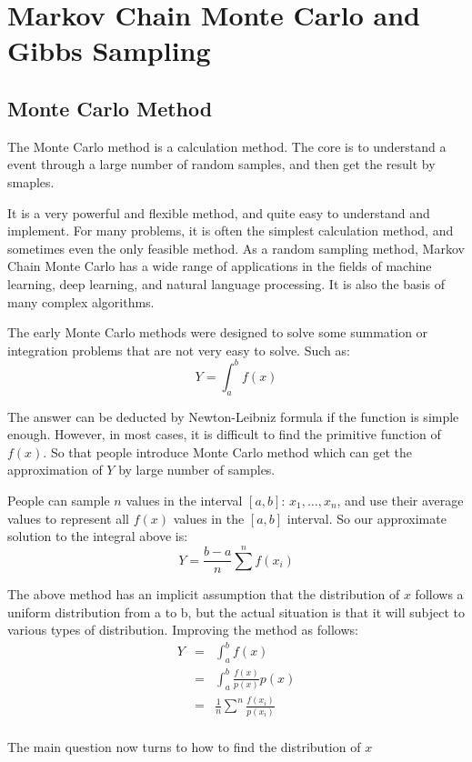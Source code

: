 \section{Markov Chain Monte Carlo and Gibbs Sampling}\label{bases}

\subsection{Monte Carlo Method}
The Monte Carlo method is a calculation method. The core is to understand a event through a large number of random samples, and then get the result by smaples.

It is a very powerful and flexible method, and quite easy to understand and implement. For many problems, it is often the simplest calculation method, and sometimes even the only feasible method.
As a random sampling method, Markov Chain Monte Carlo has a wide range of applications in the fields of machine learning, deep learning, and natural language processing. It is also the basis of many complex algorithms.

The early Monte Carlo methods were designed to solve some summation or integration problems that are not very easy to solve. Such as:
\[
Y = \int_a^b f(x)

\]

The answer can be deducted by Newton-Leibniz formula if the function is simple enough. However,
in most cases, it is difficult to find the primitive function of $f(x)$. So that people introduce Monte Carlo method  which can get the approximation of $Y$ by large number of samples.

People can sample $n$ values ​​in the interval $[a,b]$: $x_1,\dots,x_n$, and use their average values ​​to represent all $f(x)$ values ​​in the $[a,b]$ interval. So our approximate solution to the integral above is:
\[
  Y = \frac{b-a}{n}\sum^n f(x_i)
\]

The above method has an implicit assumption that the distribution of $x$ follows a uniform distribution from a to b, but the actual situation is that it will subject to  various types of distribution. Improving the method as follows:
\begin{eqnarray*}
Y &=& \int_a^b f(x) \\
  &=& \int_a^b \frac{f(x)}{p(x)}p(x) \\
  &=& \frac{1}{n} \sum^n \frac{f(x_i)}{p(x_i)}\\
\end{eqnarray*}

The main question now turns to how to find the distribution of $x$

